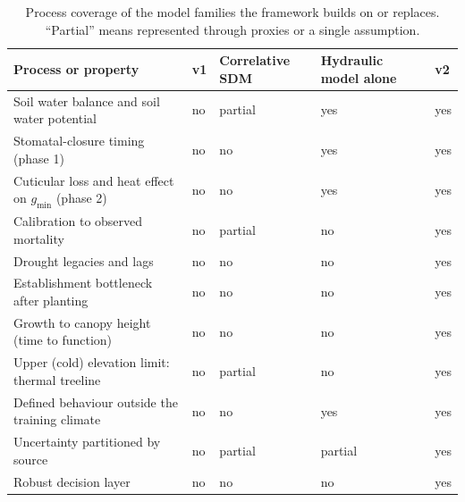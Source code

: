 \begin{table}[t]
\centering
\caption{Process coverage of the model families the framework builds on or replaces. ``Partial'' means represented through proxies or a single assumption.}\label{tab:coverage}
\footnotesize
\newcommand{\cyes}{\cellcolor{okgreen}yes}
\newcommand{\cpart}{\cellcolor{okamber}partial}
\newcommand{\cno}{\cellcolor{okred}no}
\begin{tabularx}{\linewidth}{@{}>{\raggedright\arraybackslash}X>{\centering\arraybackslash}p{1.55cm}>{\centering\arraybackslash}p{2.2cm}>{\centering\arraybackslash}p{2.6cm}>{\centering\arraybackslash}p{1.55cm}@{}}
\toprule
Process or property & v1 & Correlative SDM & Hydraulic model alone & v2\\
\midrule
Soil water balance and soil water potential & \cno & \cpart & \cyes & \cyes\\
Stomatal-closure timing (phase 1) & \cno & \cno & \cyes & \cyes\\
Cuticular loss and heat effect on $g_{\min}$ (phase 2) & \cno & \cno & \cyes & \cyes\\
Calibration to observed mortality & \cno & \cpart & \cno & \cyes\\
Drought legacies and lags & \cno & \cno & \cno & \cyes\\
Establishment bottleneck after planting & \cno & \cno & \cno & \cyes\\
Growth to canopy height (time to function) & \cno & \cno & \cno & \cyes\\
Upper (cold) elevation limit: thermal treeline & \cno & \cpart & \cno & \cyes\\
Defined behaviour outside the training climate & \cno & \cno & \cyes & \cyes\\
Uncertainty partitioned by source & \cno & \cpart & \cpart & \cyes\\
Robust decision layer & \cno & \cno & \cno & \cyes\\
\bottomrule
\end{tabularx}
\end{table}
